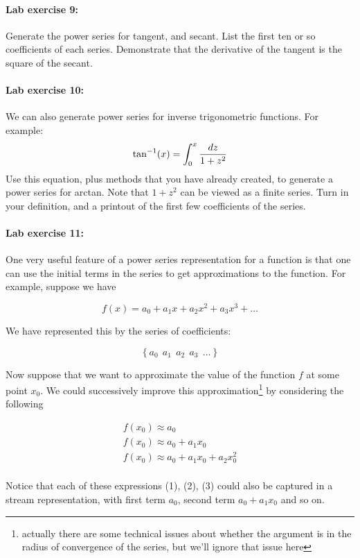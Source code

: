 \paragraph{Lab exercise 9:} Generate the power series for tangent,
and secant.  List the first ten or so coefficients of each
series.  Demonstrate that the derivative of the tangent is the square
of the secant.

\paragraph{Lab exercise 10:}  We can also generate power series for
inverse trigonometric functions.  For example:
\[\tan^{-1}(x) = \int_0^x {dz \over {1 + z^2}}\]
Use this equation, plus methods that you have already created, to
generate a power series for arctan. 
Note that $1+z^2$ can be viewed as a finite series.
Turn in your definition, and a
printout of the first few coefficients of the series.

\paragraph{Lab exercise 11:}  One very useful feature of a power
series representation for a function is that one can use the initial
terms in the series to get approximations to the function.  For
example, suppose we have

\[f(x) = a_0 + a_1x + a_2 x^2 + a_3 x^3 + \ldots\]

We have represented this by the series of coefficients:

\[\left\{a_0\ \ a_1\ \ a_2 \ \ a_3 \ \ \ldots\right\}\]

Now suppose that we want to approximate the value of the function $f$
at some point $x_0$.  We could successively improve this
approximation\footnote{actually there are some technical issues
about whether the argument is in the radius of convergence of the
series, but we'll ignore that issue here} by considering the following

\begin{eqnarray} f(x_0) \approx a_0\\ f(x_0) \approx a_0 + a_1 x_0\\
f(x_0) \approx a_0 + a_1 x_0 + a_2 x_0^2\\
\end{eqnarray}

Notice that each of these expressions (1), (2), (3) could also be captured in a
stream representation, with first term $a_0$, second term $a_0 + a_1
x_0$ and so on.

